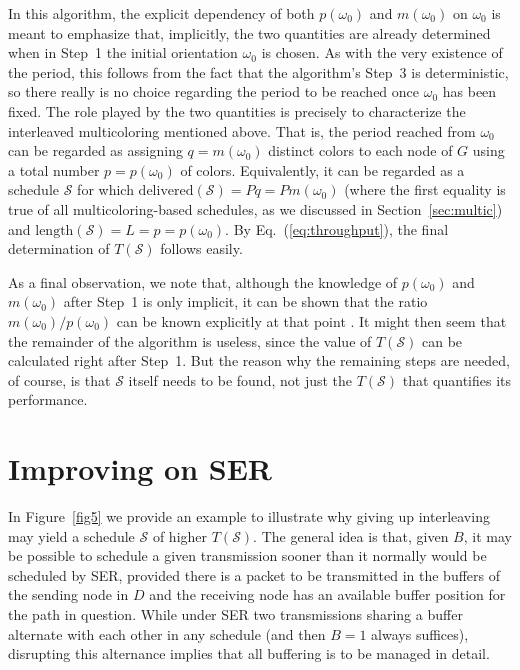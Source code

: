 \documentclass{article}
\begin{document}
In this algorithm, the explicit dependency of both $p(\omega_0)$ and
$m(\omega_0)$ on $\omega_0$ is meant to emphasize that, implicitly, the two
quantities are already determined when in Step~1 the initial orientation
$\omega_0$ is chosen. As with the very existence of the period, this follows
from the fact that the algorithm's Step~3 is deterministic, so there really is
no choice regarding the period to be reached once $\omega_0$ has been fixed. The
role played by the two quantities is precisely to characterize the interleaved
multicoloring mentioned above. That is, the period reached from $\omega_0$ can
be regarded as assigning $q=m(\omega_0)$ distinct colors to each node of $G$
using a total number $p=p(\omega_0)$ of colors. Equivalently, it can be
regarded as a schedule $\mathcal{S}$ for which
$\mathrm{delivered}(\mathcal{S})=Pq=Pm(\omega_0)$ (where the first equality is
true of all multicoloring-based schedules, as we discussed in
Section~\ref{sec:multic}) and $\mathrm{length}(\mathcal{S})=L=p=p(\omega_0)$. By
Eq.~(\ref{eq:throughput}), the final determination of $T(\mathcal{S})$ follows
easily.

As a final observation, we note that, although the knowledge of $p(\omega_0)$
and $m(\omega_0)$ after Step~1 is only implicit, it can be shown that the ratio
$m(\omega_0)/p(\omega_0)$ can be known explicitly at that point \cite{bg89}. It
might then seem that the remainder of the algorithm is useless, since the value
of $T(\mathcal{S})$ can be calculated right after Step~1. But the reason why the
remaining steps are needed, of course, is that $\mathcal{S}$ itself needs to be
found, not just the $T(\mathcal{S})$ that quantifies its performance.

\section{Improving on SER}\label{sec:sera}

In Figure~\ref{fig5} we provide an example to illustrate why giving up
interleaving may yield a schedule $\mathcal{S}$ of higher $T(\mathcal{S})$. The
general idea is that, given $B$, it may be possible to schedule a given
transmission sooner than it normally would be scheduled by SER, provided there
is a packet to be transmitted in the buffers of the sending node in $D$ and the
receiving node has an available buffer position for the path in question. While
under SER two transmissions sharing a buffer alternate with each other in any
schedule (and then $B=1$ always suffices), disrupting this alternance implies
that all buffering is to be managed in detail.
\end{document}
